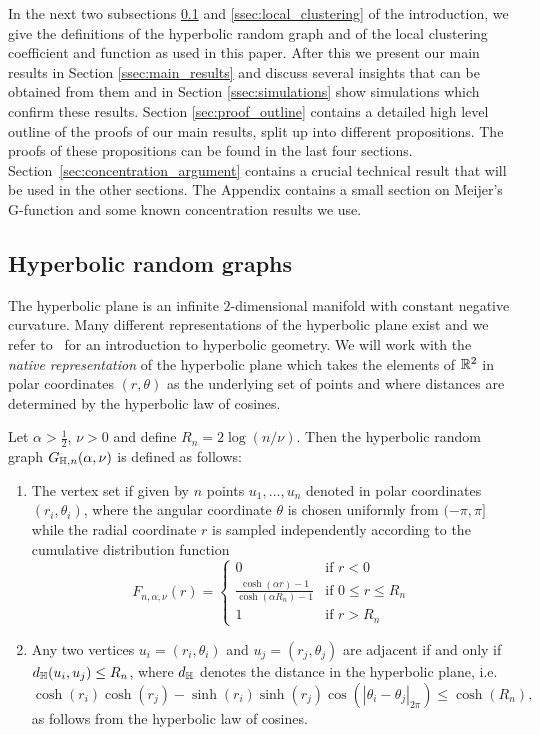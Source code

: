 In the next two subsections \ref{ssec:hyperbolic_model} and \ref{ssec:local_clustering} of the introduction, we give the definitions of the hyperbolic random graph and of the local clustering coefficient and function as used in this paper. After this we present our main results in Section \ref{ssec:main_results} and discuss several insights that can be obtained from them and in Section \ref{ssec:simulations} show simulations which confirm these results. Section \ref{sec:proof_outline} contains a detailed high level outline of the proofs of our main results, split up into different propositions. The proofs of these propositions can be found in the last four sections. Section~\ref{sec:concentration_argument} contains a crucial technical result that will be used in the other sections. The Appendix contains a small section on Meijer's G-function and some known concentration results we use.

\subsection{Hyperbolic random graphs}\label{ssec:hyperbolic_model}

The hyperbolic plane is an infinite $2$-dimensional manifold with constant negative curvature. Many different representations of the hyperbolic plane exist and we refer to~\cite{anderson2006hyperbolic} \cite{katok1992fuchsian} \cite{beardon2012geometry} for an introduction to hyperbolic geometry.  We will work with the \emph{native representation} of the hyperbolic plane which takes the elements of ${\mathbb R}^2$ in polar coordinates $(r,\theta)$ as the underlying set of points and where distances are determined by the hyperbolic law of cosines.

Let $\alpha > \frac{1}{2}$, $\nu > 0$ and define $R_n = 2\log(n/\nu)$. Then the hyperbolic random graph $G_{\mathbb{H},n}(\alpha, \nu)$ is defined as follows:
\begin{enumerate}
\item The vertex set if given by $n$ points $u_1, \dots, u_n$ denoted in polar coordinates $(r_i, \theta_i)$, where the angular coordinate $\theta$ is chosen uniformly from $(-\pi,\pi]$ while the radial coordinate $r$ is sampled independently according to the cumulative distribution function
\begin{equation}\label{eq:def_hyperbolic_point_distribution}
	F_{n,\alpha,\nu}(r) = \begin{cases}
		0 &\mbox{if } r < 0\\
		\frac{\cosh(\alpha r)-1}{\cosh(\alpha R_n) - 1} &\mbox{if } 0 \le r \le R_n\\
		1&\mbox{if } r > R_n
	\end{cases}
\end{equation}
\item Any two vertices $u_i=(r_i,\theta_i)$ and $u_j=(r_j,\theta_j)$ are adjacent if and only if $d_{\mathbb{H}}(u_i,u_j) \le R_n$, where $d_{\mathbb{H}}$ denotes the distance in the hyperbolic plane, i.e.
\[
	\cosh(r_i) \cosh(r_j) - \sinh(r_i) \sinh( r_j) \cos(|\theta_i-\theta_j|_{2\pi}) \le \cosh(R_n),
\]
as follows from the hyperbolic law of cosines.%
\end{enumerate}

